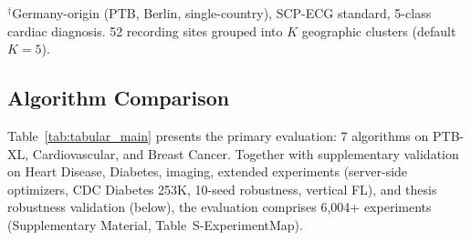 \documentclass[conference]{IEEEtran}
\begin{document}
\begin{table}[htbp]
\centering
\caption{Evaluated Dataset Coverage}
\label{tab:dataset_coverage}

\vspace{1mm}
\footnotesize{$^\dagger$Germany-origin (PTB, Berlin, single-country), SCP-ECG standard, 5-class cardiac diagnosis. 52 recording sites grouped into $K$ geographic clusters (default $K{=}5$).}
\end{table}

\subsection{Algorithm Comparison}

Table~\ref{tab:tabular_main} presents the primary evaluation: 7 algorithms on PTB-XL, Cardiovascular, and Breast Cancer. Together with supplementary validation on Heart Disease, Diabetes, imaging, extended experiments (server-side optimizers, CDC Diabetes 253K, 10-seed robustness, vertical FL), and thesis robustness validation (below), the evaluation comprises 6,004+ experiments (Supplementary Material, Table~S-ExperimentMap).
\end{document}

